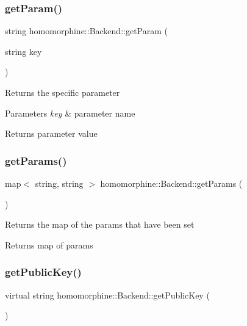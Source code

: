 \mbox{\label{classhomomorphine_1_1_backend_a34191d0dbdd9e300a88242156f90eb9b}} 
\subsubsection{\texorpdfstring{getParam()}{getParam()}}
{\footnotesize\ttfamily string homomorphine\+::\+Backend\+::get\+Param (\begin{DoxyParamCaption}\item[{string}]{key }\end{DoxyParamCaption})}

Returns the specific parameter


\begin{DoxyParams}{Parameters}
{\em key} & parameter name \\
\hline
\end{DoxyParams}
\begin{DoxyReturn}{Returns}
parameter value 
\end{DoxyReturn}
\mbox{\label{classhomomorphine_1_1_backend_a107e05b3bd55271356a57fbc0c1df091}} 
\subsubsection{\texorpdfstring{getParams()}{getParams()}}
{\footnotesize\ttfamily map$<$ string, string $>$ homomorphine\+::\+Backend\+::get\+Params (\begin{DoxyParamCaption}{ }\end{DoxyParamCaption})}

Returns the map of the params that have been set

\begin{DoxyReturn}{Returns}
map of params 
\end{DoxyReturn}
\mbox{\label{classhomomorphine_1_1_backend_a8bba422ac5b13e77030a884cfd6a0463}} 
\subsubsection{\texorpdfstring{getPublicKey()}{getPublicKey()}}
{\footnotesize\ttfamily virtual string homomorphine\+::\+Backend\+::get\+Public\+Key (\begin{DoxyParamCaption}{ }\end{DoxyParamCaption})\hspace{0.3cm}{\ttfamily [pure virtual]}}

